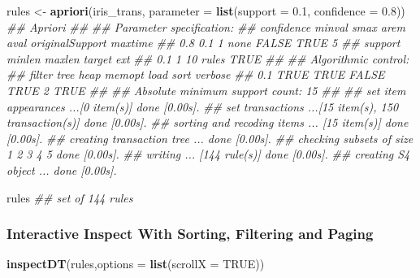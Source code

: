 \documentclass[
  notitlepage]{book}
\newenvironment{Shaded}{\begin{snugshade}}{\end{snugshade}}
\newcommand{\CommentTok}[1]{\textcolor[rgb]{0.56,0.35,0.01}{\textit{#1}}}
\newcommand{\DataTypeTok}[1]{\textcolor[rgb]{0.13,0.29,0.53}{#1}}
\newcommand{\FloatTok}[1]{\textcolor[rgb]{0.00,0.00,0.81}{#1}}
\newcommand{\KeywordTok}[1]{\textcolor[rgb]{0.13,0.29,0.53}{\textbf{#1}}}
\newcommand{\NormalTok}[1]{#1}
\newcommand{\OtherTok}[1]{\textcolor[rgb]{0.56,0.35,0.01}{#1}}
\newcommand{\StringTok}[1]{\textcolor[rgb]{0.31,0.60,0.02}{#1}}
\begin{document}
\begin{Shaded}
\begin{Highlighting}[]
\NormalTok{rules \textless{}{-}}\StringTok{ }\KeywordTok{apriori}\NormalTok{(iris\_trans, }\DataTypeTok{parameter =} \KeywordTok{list}\NormalTok{(}\DataTypeTok{support =} \FloatTok{0.1}\NormalTok{, }
                                              \DataTypeTok{confidence =} \FloatTok{0.8}\NormalTok{))}
\CommentTok{\#\# Apriori}
\CommentTok{\#\# }
\CommentTok{\#\# Parameter specification:}
\CommentTok{\#\#  confidence minval smax arem  aval originalSupport maxtime}
\CommentTok{\#\#         0.8    0.1    1 none FALSE            TRUE       5}
\CommentTok{\#\#  support minlen maxlen target  ext}
\CommentTok{\#\#      0.1      1     10  rules TRUE}
\CommentTok{\#\# }
\CommentTok{\#\# Algorithmic control:}
\CommentTok{\#\#  filter tree heap memopt load sort verbose}
\CommentTok{\#\#     0.1 TRUE TRUE  FALSE TRUE    2    TRUE}
\CommentTok{\#\# }
\CommentTok{\#\# Absolute minimum support count: 15 }
\CommentTok{\#\# }
\CommentTok{\#\# set item appearances ...[0 item(s)] done [0.00s].}
\CommentTok{\#\# set transactions ...[15 item(s), 150 transaction(s)] done [0.00s].}
\CommentTok{\#\# sorting and recoding items ... [15 item(s)] done [0.00s].}
\CommentTok{\#\# creating transaction tree ... done [0.00s].}
\CommentTok{\#\# checking subsets of size 1 2 3 4 5 done [0.00s].}
\CommentTok{\#\# writing ... [144 rule(s)] done [0.00s].}
\CommentTok{\#\# creating S4 object  ... done [0.00s].}
\end{Highlighting}
\end{Shaded}

\begin{Shaded}
\begin{Highlighting}[]
\NormalTok{rules}
\CommentTok{\#\# set of 144 rules}
\end{Highlighting}
\end{Shaded}

\hypertarget{interactive-inspect-with-sorting-filtering-and-paging}{%
\subsubsection{Interactive Inspect With Sorting, Filtering and Paging}\label{interactive-inspect-with-sorting-filtering-and-paging}}

\begin{Shaded}
\begin{Highlighting}[]
\KeywordTok{inspectDT}\NormalTok{(rules,}\DataTypeTok{options =} \KeywordTok{list}\NormalTok{(}\DataTypeTok{scrollX =} \OtherTok{TRUE}\NormalTok{))}
\end{Highlighting}
\end{Shaded}
\end{document}
